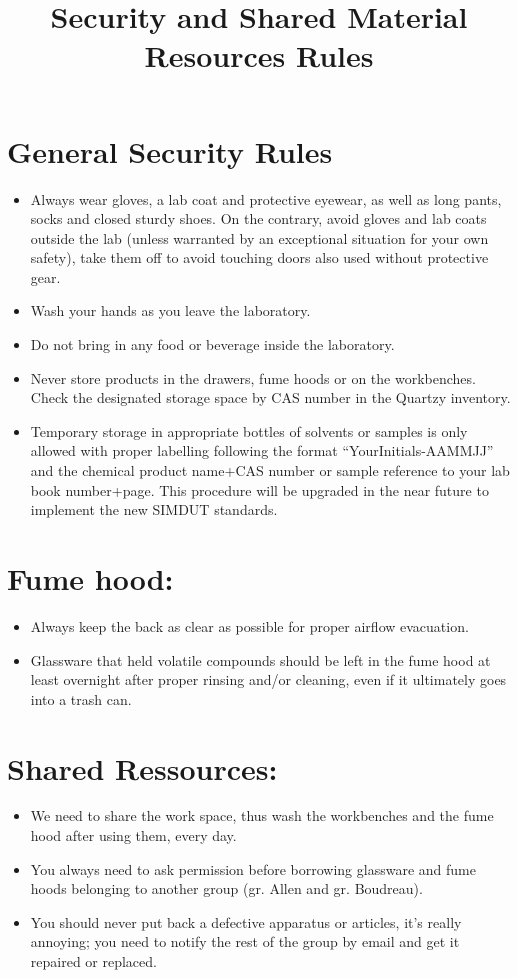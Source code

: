 \documentclass{article}
\title{Security and Shared Material Resources Rules}
\date{}
\begin{document}
\maketitle

\section*{General Security Rules}
\begin{itemize}
    \item Always wear gloves, a lab coat and protective eyewear, as well as long pants, socks and closed sturdy shoes. On the contrary, avoid gloves and lab coats outside the lab (unless warranted by an exceptional situation for your own safety), take them off to avoid touching doors also used without protective gear.
    \item Wash your hands as you leave the laboratory.
    \item Do not bring in any food or beverage inside the laboratory.
    \item Never store products in the drawers, fume hoods or on the workbenches. Check the designated storage space by CAS number in the Quartzy inventory.
    \item Temporary storage in appropriate bottles of solvents or samples is only allowed with proper labelling following the format ``YourInitials-AAMMJJ'' and the chemical product name+CAS number or sample reference to your lab book number+page. This procedure will be upgraded in the near future to implement the new SIMDUT standards.
\end{itemize}


\section*{Fume hood:}
\begin{itemize}
    \item Always keep the back as clear as possible for proper airflow evacuation.
    \item Glassware that held volatile compounds should be left in the fume hood at least overnight after proper rinsing and/or cleaning, even if it ultimately goes into a trash can.
\end{itemize}


\section*{Shared Ressources:}
\begin{itemize}
    \item We need to share the work space, thus wash the workbenches and the fume hood after using them, every day.
    \item You always need to ask permission before borrowing glassware and fume hoods belonging to another group (gr. Allen and gr. Boudreau).
    \item You should never put back a defective apparatus or articles, it’s really annoying; you need to notify the rest of the group by email and get it repaired or replaced.
\end{itemize}
\end{document}
